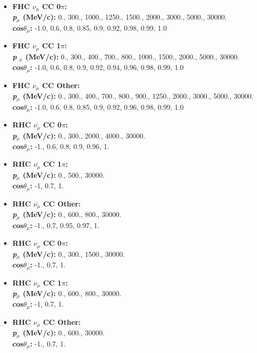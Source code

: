 \begin{itemize}
\setlength\itemsep{1mm}
\item \textbf{FHC $\nu_{\mu}$ CC 0$\pi$:}\\
\textbf{\textit{p}$_{\mu}$ (MeV/c):} 0., 300., 1000., 1250., 1500., 2000., 3000., 5000., 30000.\\
\textbf{cos$\theta_{\mu}$:} -1.0, 0.6, 0.8, 0.85, 0.9, 0.92, 0.98, 0.99, 1.0

\item \textbf{FHC $\nu_{\mu}$ CC 1$\pi$:}\\
\textbf{\textit{p} $_{\mu}$ (MeV/c):} 0., 300., 400., 700., 800., 1000., 1500., 2000., 5000., 30000.\\
\textbf{cos$\theta_{\mu}$:} -1.0, 0.6, 0.8, 0.9, 0.92, 0.94, 0.96, 0.98, 0.99, 1.0

\item \textbf{FHC $\nu_{\mu}$ CC Other:} \\
\textbf{\textit{p}$_{\mu}$ (MeV/c):} 0., 300., 400., 700., 800., 900., 1250., 2000., 3000., 5000., 30000.\\
\textbf{cos$\theta_{\mu}$:} -1.0, 0.6, 0.8, 0.85, 0.9, 0.92, 0.96, 0.98, 0.99, 1.0

\item \textbf{RHC $\bar{\nu_{\mu}}$ CC 0$\pi$:}\\
\textbf{\textit{p}$_{\mu}$ (MeV/c):} 0., 300., 2000., 4000., 30000.\\
\textbf{cos$\theta_{\mu}$:} -1., 0.6, 0.8, 0.9, 0.96, 1.

\item \textbf{RHC $\bar{\nu_{\mu}}$ CC 1$\pi$:}\\
\textbf{\textit{p}$_{\mu}$ (MeV/c):} 0., 500., 30000.\\
\textbf{cos$\theta_{\mu}$:} -1, 0.7, 1.

\item \textbf{RHC $\bar{\nu_{\mu}}$ CC Other:}\\
\textbf{\textit{p}$_{\mu}$ (MeV/c):} 0., 600., 800., 30000.\\
\textbf{cos$\theta_{\mu}$:} -1., 0.7, 0.95, 0.97, 1.

\item \textbf{RHC $\nu_{\mu}$ CC 0$\pi$:}\\
\textbf{\textit{p}$_{\mu}$ (MeV/c):} 0., 300., 1500., 30000.\\
\textbf{cos$\theta_{\mu}$:} -1., 0.7, 1.

\item \textbf{RHC $\nu_{\mu}$ CC 1$\pi$:}\\
\textbf{\textit{p}$_{\mu}$ (MeV/c):} 0., 600., 800., 30000.\\
\textbf{cos$\theta_{\mu}$:} -1, 0.7, 1.

\item \textbf{RHC $\nu_{\mu}$ CC Other:}\\
\textbf{\textit{p}$_{\mu}$ (MeV/c):} 0., 600., 30000.\\
\textbf{cos$\theta_{\mu}$:} -1., 0.7, 1.

\end{itemize}

